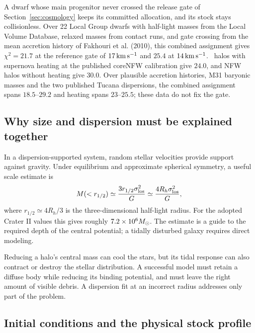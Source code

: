 A dwarf whose main progenitor never crossed the release gate of
Section~\ref{sec:cosmology} keeps its committed allocation, and its stock
stays collisionless. Over 22 Local Group dwarfs with half-light masses
from the Local Volume Database, relaxed masses from contact runs, and gate
crossing from the mean accretion history of Fakhouri et al. (2010), this
combined assignment gives $\chi^2=21.7$ at the reference gate of
$17\,\mathrm{km\,s^{-1}}$ and $25.4$ at $14\,\mathrm{km\,s^{-1}}$. \LCDM\ halos with supernova heating
at the published coreNFW calibration give $24.0$, and NFW halos without
heating give $30.0$. Over plausible accretion histories, M31 baryonic
masses and the two published Tucana dispersions, the combined assignment
spans $18.5$--$29.2$ and heating spans $23$--$25.5$; these data do not fix
the gate. 

\subsection{Why size and dispersion must be explained together}

In a dispersion-supported system, random stellar velocities provide
support against gravity. Under equilibrium and approximate spherical
symmetry, a useful scale estimate is
\begin{equation}
M(<r_{1/2})\simeq\frac{3r_{1/2}\sigma_{\rm los}^2}{G}
\simeq\frac{4R_h\sigma_{\rm los}^2}{G},
\label{eq:wolf}
\end{equation}
where $r_{1/2}\simeq4R_h/3$ is the three-dimensional half-light radius.
For the adopted Crater II values this gives roughly
$7.2\times10^6M_\odot$. The estimate is a guide to the required depth of
the central potential; a tidally disturbed galaxy requires direct
modeling. \cite{wolf}

Reducing a halo's central mass can cool the stars, but its tidal response
can also contract or destroy the stellar distribution. A successful model
must retain a diffuse body while reducing its binding potential, and
must leave the right amount of visible debris. A dispersion fit at an
incorrect radius addresses only part of the problem.

\subsection{Initial conditions and the physical stock profile}

